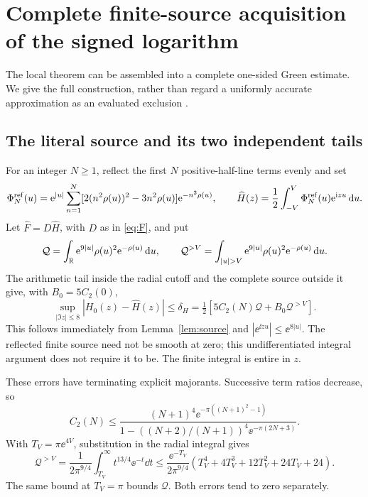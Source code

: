 \section{Complete finite-source acquisition of the signed logarithm}
\label{sec:signed-acquisition}

The local theorem can be assembled into a complete one-sided Green
estimate. We give the full construction, rather than regard a uniformly
accurate approximation as an evaluated exclusion
\cite{OGAssemblyProof,OGAssemblyAssessment}.

\subsection{The literal source and its two independent tails}
For an integer \(N\ge1\), reflect the first \(N\) positive-half-line
terms evenly and set
\[
 \Phi_N^{\rm ref}(u)=\mathrm e^{|u|}\sum_{n=1}^N
 [2(n^2\rho(u))^2-3n^2\rho(u)]\mathrm e^{-n^2\rho(u)},\qquad
 \widehat H(z)=\frac12\int_{-V}^V\Phi_N^{\rm ref}(u)\mathrm e^{\mathrm i zu}\,\mathrm d u.
\]
Let \(\widehat F=D\widehat H\), with \(D\) as in \eqref{eq:F}, and put
\[
 \mathcal Q=\int_\R\ee^{9|u|}\rho(u)^2\ee^{-\rho(u)}\dd u,
 \qquad \mathcal Q^{>V}=\int_{|u|>V}\ee^{9|u|}\rho(u)^2\ee^{-\rho(u)}\dd u.
\]
The arithmetic tail inside the radial cutoff and the complete source
outside it give, with \(B_0=5C_2(0)\),
\begin{equation}\label{eq:delta-H}
 \sup_{|\Im z|\le8}|H_0(z)-\widehat H(z)|
 \le\delta_H=\tfrac12[5C_2(N)\mathcal Q+B_0\mathcal Q^{>V}].
\end{equation}
This follows immediately from Lemma~\ref{lem:source} and
\(|\ee^{\ii zu}|\le\ee^{8|u|}\). The reflected finite source need not
be smooth at zero; this undifferentiated integral argument does not
require it to be. The finite integral is entire in \(z\).

These errors have terminating explicit majorants. Successive term
ratios decrease, so
\[
 C_2(N)\le
 \frac{(N+1)^4\ee^{-\pi((N+1)^2-1)}}
 {1-((N+2)/(N+1))^4\ee^{-\pi(2N+3)}}.
\]
With \(T_V=\pi\ee^{4V}\), substitution in the radial integral gives
\begin{equation}\label{eq:radial-majorant}
 \mathcal Q^{>V}=\frac1{2\pi^{9/4}}\int_{T_V}^\infty t^{13/4}\ee^{-t}\dd t
 \le\frac{\ee^{-T_V}}{2\pi^{9/4}}
       (T_V^4+4T_V^3+12T_V^2+24T_V+24).
\end{equation}
The same bound at \(T_V=\pi\) bounds \(\mathcal Q\). Both errors tend
to zero separately.

